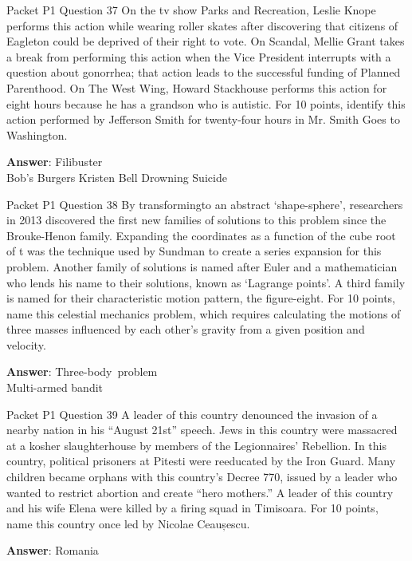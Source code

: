 \begin{frame}{Packet P1 Question 37}
On the tv show Parks and   Recreation, Leslie Knope performs this action while wearing roller skates after discovering that citizens of Eagleton could be deprived of   their right to vote. On Scandal, Mellie Grant takes a break from performing this action when the Vice President interrupts with a question about gonorrhea; that action leads to the successful funding of Planned Parenthood. On The West Wing, Howard Stackhouse performs this action for eight hours because he has a grandson who is autistic. For 10 points, identify this action performed by Jefferson Smith for twenty-four hours in Mr. Smith Goes to Washington.    

\textbf{Answer}: Filibuster\\
 Bob's Burgers
 Kristen Bell
 Drowning
 Suicide
\end{frame}

\begin{frame}{Packet P1 Question 38}
By transformingto an abstract `shape-sphere', researchers in 2013 discovered the first new families of solutions to this problem since the Brouke-Henon family.  Expanding the coordinates as a function of the cube root of t was the technique used by Sundman to create   a series expansion for this problem.  Another family of   solutions is named after Euler and a mathematician who lends his name to their solutions, known as `Lagrange points'. A   third family is named for their characteristic motion pattern, the figure-eight. For 10 points, name this celestial mechanics problem, which requires calculating the motions of three masses influenced by each other's gravity from a given position and velocity.  

\textbf{Answer}: Three-body\ problem\\
 Multi-armed bandit
\end{frame}

\begin{frame}{Packet P1 Question 39}
A leader of this country denounced the invasion of a nearby nation in his ``August 21st'' speech. Jews in this country were massacred at a kosher slaughterhouse by members of the Legionnaires’ Rebellion. In this country, political prisoners at Pitesti were reeducated by the Iron Guard. Many children became   orphans with this country's Decree 770, issued by a leader who wanted to restrict abortion and create   “hero mothers.” A leader of this country and his wife Elena were killed by     a firing squad in Timisoara. For 10 points, name this country once led by Nicolae Ceaușescu.

\textbf{Answer}: Romania\\
\end{frame}


